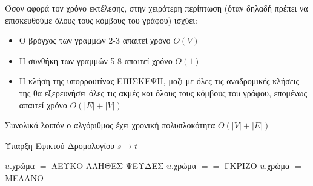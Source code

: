 \documentclass{article}
\begin{document}
Όσον αφορά τον χρόνο εκτέλεσης, στην χειρότερη περίπτωση (όταν δηλαδή πρέπει να επισκευθούμε όλους τους κόμβους του γράφου) ισχύει:
\begin{itemize}
    \item Ο βρόγχος των γραμμών 2-3 απαιτεί χρόνο $ O(V)$
    \item Η συνθήκη των γραμμών 5-8 απαιτεί χρόνο $ O(1)$
    \item Η κλήση της υπορρουτίνας ΕΠΙΣΚΕΨΗ, μαζι με όλες τις αναδρομικές κλήσεις της θα εξερευνήσει όλες τις ακμές και όλους τους κόμβους του γράφου, επομένως απαιτεί χρόνο $ O(|Ε| + |V|) $ 
\end{itemize}
Συνολικά λοιπόν ο αλγόριθμος έχει χρονική πολυπλοκότητα $ O(|V|+|E|) $
\begin{algorithm}

\renewcommand{\algorithmicif}{\textbf{\foreignlanguage{greek}{Αν}}}
\renewcommand{\algorithmicfor}{\textbf{\foreignlanguage{greek}{Για}}}
\renewcommand{\algorithmicend}{\textbf{\foreignlanguage{greek}{Τέλος}}}
\renewcommand{\algorithmicdo}{}
\renewcommand{\algorithmicthen}{\textbf{\foreignlanguage{greek}{τότε}}}
\renewcommand{\algorithmicreturn}{\textbf{\foreignlanguage{greek}{Επίστρεψε}}}
\renewcommand{\algorithmicelse}{\textbf{\foreignlanguage{greek}{Αλλιώς}}}
\renewcommand{\algorithmicprocedure}{}

\caption{\foreignlanguage{greek}{Ύπαρξη Εφικτού Δρομολογίου $s \rightarrow t$}} \label{alg:pathexists}
\begin{algorithmic}[1]
    \State$u.$\foreignlanguage{greek}{χρώμα} $=$ \foreignlanguage{greek}{ΛΕΥΚΟ}
\EndFor
\State {}
    \State \Return \foreignlanguage{greek}{ΑΛΗΘΕΣ}
\Else
    \State \Return \foreignlanguage{greek}{ΨΕΥΔΕΣ}
\EndIf
\EndProcedure
\Statex
{}
    \State $u.$\foreignlanguage{greek}{χρώμα} $==$ \foreignlanguage{greek}{ΓΚΡΙΖΟ}
            \State {}
        \EndIf
    \EndFor
    \State $u.$\foreignlanguage{greek}{χρώμα} $=$ \foreignlanguage{greek}{ΜΕΛΑΝΟ}
\EndProcedure
\end{algorithmic}    
\end{algorithm}
\end{document}
